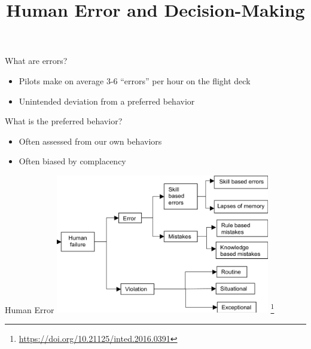 \documentclass[aspectratio=169,notes]{beamer}
\title{Human Error and Decision-Making}
\institute{Engineers for Exploration, UC San Diego}
\begin{document}
\maketitle
\begin{frame}{What are errors?}
    \begin{itemize}
        \item Pilots make on average 3-6 ``errors'' per hour on the flight deck
        \item Unintended deviation from a preferred behavior
    \end{itemize}
\end{frame}
\begin{frame}{What is the preferred behavior?}
    \begin{itemize}
        \item Often assessed from our own behaviors
        \item Often biased by complacency
    \end{itemize}
\end{frame}
\begin{frame}{Human Error}
    \centering
    \includegraphics[width=0.7\textwidth]{types_of_human_failure.png} \footnote{\url{https://doi.org/10.21125/inted.2016.0391}}
\end{frame}
\end{document}
